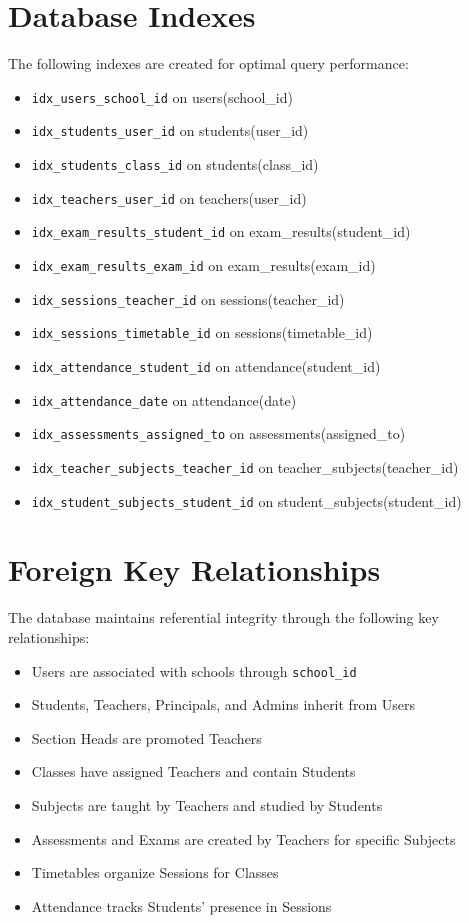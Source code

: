 \documentclass[11pt,a4paper]{article}
\begin{document}
\section{Database Indexes}

The following indexes are created for optimal query performance:

\begin{itemize}
    \item \texttt{idx\_users\_school\_id} on users(school\_id)
    \item \texttt{idx\_students\_user\_id} on students(user\_id)
    \item \texttt{idx\_students\_class\_id} on students(class\_id)
    \item \texttt{idx\_teachers\_user\_id} on teachers(user\_id)
    \item \texttt{idx\_exam\_results\_student\_id} on exam\_results(student\_id)
    \item \texttt{idx\_exam\_results\_exam\_id} on exam\_results(exam\_id)
    \item \texttt{idx\_sessions\_teacher\_id} on sessions(teacher\_id)
    \item \texttt{idx\_sessions\_timetable\_id} on sessions(timetable\_id)
    \item \texttt{idx\_attendance\_student\_id} on attendance(student\_id)
    \item \texttt{idx\_attendance\_date} on attendance(date)
    \item \texttt{idx\_assessments\_assigned\_to} on assessments(assigned\_to)
    \item \texttt{idx\_teacher\_subjects\_teacher\_id} on teacher\_subjects(teacher\_id)
    \item \texttt{idx\_student\_subjects\_student\_id} on student\_subjects(student\_id)
\end{itemize}

\section{Foreign Key Relationships}

The database maintains referential integrity through the following key relationships:

\begin{itemize}
    \item Users are associated with schools through \texttt{school\_id}
    \item Students, Teachers, Principals, and Admins inherit from Users
    \item Section Heads are promoted Teachers
    \item Classes have assigned Teachers and contain Students
    \item Subjects are taught by Teachers and studied by Students
    \item Assessments and Exams are created by Teachers for specific Subjects
    \item Timetables organize Sessions for Classes
    \item Attendance tracks Students' presence in Sessions
\end{itemize}
\end{document}
